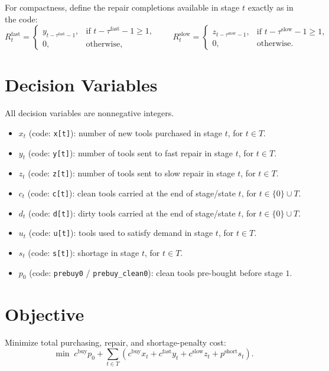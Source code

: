 For compactness, define the repair completions available in stage $t$ exactly as in the code:
\[
R^{\text{fast}}_t =
\begin{cases}
y_{t-\tau^{\text{fast}}-1}, & \text{if } t-\tau^{\text{fast}}-1 \ge 1,\\
0, & \text{otherwise,}
\end{cases}
\qquad
R^{\text{slow}}_t =
\begin{cases}
z_{t-\tau^{\text{slow}}-1}, & \text{if } t-\tau^{\text{slow}}-1 \ge 1,\\
0, & \text{otherwise.}
\end{cases}
\]

\section*{Decision Variables}

All decision variables are nonnegative integers.

\begin{itemize}
    \item $x_t$ (code: \texttt{x[t]}): number of new tools purchased in stage $t$, for $t\in T$.
    \item $y_t$ (code: \texttt{y[t]}): number of tools sent to fast repair in stage $t$, for $t\in T$.
    \item $z_t$ (code: \texttt{z[t]}): number of tools sent to slow repair in stage $t$, for $t\in T$.
    \item $c_t$ (code: \texttt{c[t]}): clean tools carried at the end of stage/state $t$, for $t\in \{0\}\cup T$.
    \item $d_t$ (code: \texttt{d[t]}): dirty tools carried at the end of stage/state $t$, for $t\in \{0\}\cup T$.
    \item $u_t$ (code: \texttt{u[t]}): tools used to satisfy demand in stage $t$, for $t\in T$.
    \item $s_t$ (code: \texttt{s[t]}): shortage in stage $t$, for $t\in T$.
    \item $p_0$ (code: \texttt{prebuy0} / \texttt{prebuy\_clean0}): clean tools pre-bought before stage $1$.
\end{itemize}

\section*{Objective}

Minimize total purchasing, repair, and shortage-penalty cost:
\[
\min \;
c^{\text{buy}} p_0
+\sum_{t\in T}\left(
c^{\text{buy}} x_t
+c^{\text{fast}} y_t
+c^{\text{slow}} z_t
+p^{\text{short}} s_t
\right).
\]

